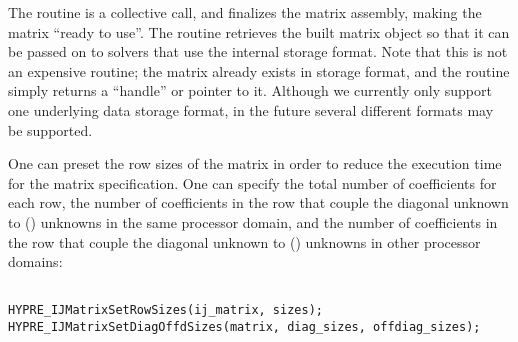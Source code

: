 The  routine is a collective call, and finalizes the
matrix assembly, making the matrix ``ready to use''.  The
 routine retrieves the built matrix object so that
it can be passed on to \hypre{} solvers that use the 
internal storage format.  Note that this is not an expensive routine;
the matrix already exists in  storage format, and the
routine simply returns a ``handle'' or pointer to it.  Although we
currently only support one underlying data storage format, in the
future several different formats may be supported.

One can preset the row sizes of the matrix in order to reduce the
execution time for the matrix specification.  One can specify the
total number of coefficients for each row, the number of coefficients
in the row that couple the diagonal unknown to () unknowns
in the same processor domain, and the number of coefficients in the
row that couple the diagonal unknown to () unknowns in
other processor domains:

\begin{display}
\begin{verbatim}

HYPRE_IJMatrixSetRowSizes(ij_matrix, sizes);
HYPRE_IJMatrixSetDiagOffdSizes(matrix, diag_sizes, offdiag_sizes);

\end{verbatim}
\end{display}

